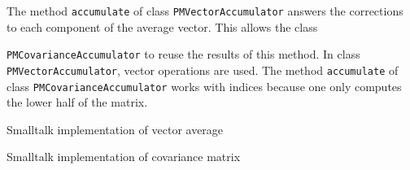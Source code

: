 The method \texttt{accumulate} of class \texttt{PMVectorAccumulator}
answers the corrections to each component of the average vector.
This allows the class {\texttt{PMCovarianceAccumulator} to reuse the
results of this method. In class \texttt{PMVectorAccumulator},
vector operations are used. The method \texttt{accumulate} of class
\texttt{PMCovarianceAccumulator} works with indices because one only
computes the lower half of the matrix.

\begin{listing} Smalltalk implementation of vector average \label{ls:vectoraverage}

\end{listing}

\begin{listing} Smalltalk implementation of covariance matrix \label{ls:covmatrix}

\end{listing}

}
